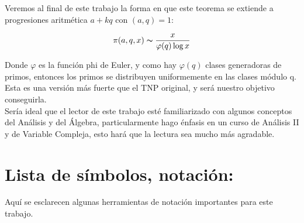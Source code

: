 Veremos al final de este trabajo la forma en que este teorema se extiende a progresiones aritmética $a+kq$ con $(a,q)=1$:

$$\pi(a,q,x)\thicksim \frac{x}{\varphi(q)\log x}$$

Donde $\varphi$ es la función phi de Euler, y como hay $\varphi(q)$ clases generadoras de primos, entonces los primos se distribuyen uniformemente en las clases módulo q. Esta es una versión más fuerte que el TNP original, y será nuestro objetivo conseguirla.\\

Sería ideal que el lector de este trabajo esté familiarizado con algunos conceptos del Análisis y del Álgebra, particularmente hago énfasis en un curso de Análisis II y de Variable Compleja, esto hará que la lectura sea  mucho más agradable.

\newpage

\chapter*{Lista de símbolos, notación:}
\thispagestyle{empty}


Aquí se esclarecen algunas herramientas de notación importantes para este trabajo.

